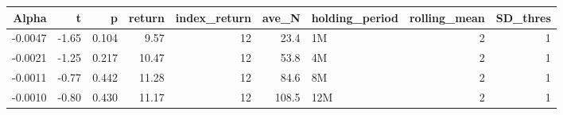 \begin{table}[ht]
\centering
\begin{tabular}{rrrrrrlrr}
  \hline
Alpha & t & p & return & index\_return & ave\_N & holding\_period & rolling\_mean & SD\_thres \\ 
  \hline
-0.0047 & -1.65 & 0.104 & 9.57 & 12 & 23.4 & 1M &  2 &  1 \\ 
  -0.0021 & -1.25 & 0.217 & 10.47 & 12 & 53.8 & 4M &  2 &  1 \\ 
  -0.0011 & -0.77 & 0.442 & 11.28 & 12 & 84.6 & 8M &  2 &  1 \\ 
  -0.0010 & -0.80 & 0.430 & 11.17 & 12 & 108.5 & 12M &  2 &  1 \\ 
   \hline
\end{tabular}
\end{table}

